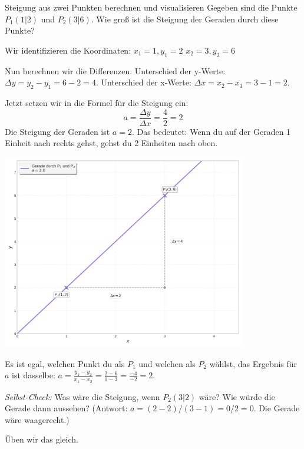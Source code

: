 \begin{beispielumgebung}[Steigungsdreieck]{Steigung aus zwei Punkten berechnen und visualisieren}
Gegeben sind die Punkte $P_1(1|2)$ und $P_2(3|6)$. Wie groß ist die Steigung der Geraden durch diese Punkte?

Wir identifizieren die Koordinaten:
$x_1 = 1, y_1 = 2$
$x_2 = 3, y_2 = 6$

Nun berechnen wir die Differenzen:
Unterschied der y-Werte: $\Delta y = y_2 - y_1 = 6 - 2 = 4$.
Unterschied der x-Werte: $\Delta x = x_2 - x_1 = 3 - 1 = 2$.

Jetzt setzen wir in die Formel für die Steigung ein:
\[ a = \frac{\Delta y}{\Delta x} = \frac{4}{2} = 2 \]
Die Steigung der Geraden ist $a=2$. Das bedeutet: Wenn du auf der Geraden 1 Einheit nach rechts gehst, gehst du 2 Einheiten nach oben.

\begin{center}
    \includegraphics[width=0.8\textwidth]{grafiken/Lineare_Funktion_Steigungsdreieck.png}
    \label{fig:steigungsdreieck_beispiel}
\end{center}
Es ist egal, welchen Punkt du als $P_1$ und welchen als $P_2$ wählst, das Ergebnis für $a$ ist dasselbe:
$a = \frac{y_1 - y_2}{x_1 - x_2} = \frac{2 - 6}{1 - 3} = \frac{-4}{-2} = 2$.
\end{beispielumgebung}

\textit{Selbst-Check:} Was wäre die Steigung, wenn $P_2(3|2)$ wäre? Wie würde die Gerade dann aussehen? (Antwort: $a = (2-2)/(3-1) = 0/2 = 0$. Die Gerade wäre waagerecht.)

Üben wir das gleich.

